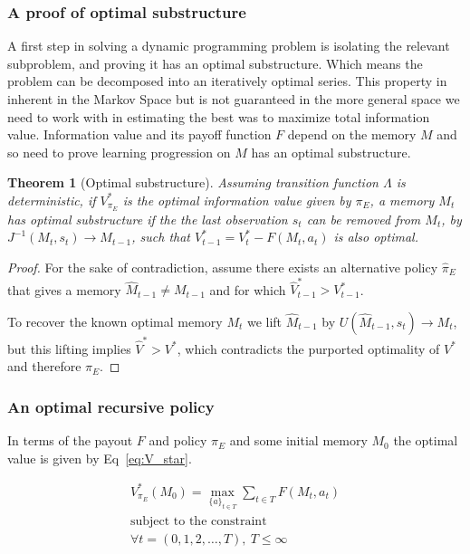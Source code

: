\documentclass[9pt,twocolumn,twoside]{pnas-new}
\newtheorem{theorem}{Theorem}
\begin{document}
\subsubsection*{A proof of optimal substructure}
A first step in solving a dynamic programming problem is isolating the relevant subproblem, and proving it has an optimal substructure. Which means the problem can be decomposed into an iteratively optimal series. This property in inherent in the Markov Space %
but is not guaranteed in the more general space we need to work with in estimating the best was to maximize total information value. Information value and its payoff function $F$ depend on the memory $M$ and so need to prove learning progression on $M$ has an optimal substructure.

\begin{theorem}[Optimal substructure] \label{theorem:opt_sub}
    Assuming transition function $\Lambda$ is deterministic, if $V^*_{\pi_E}$ is the optimal information value given by $\pi_E$, a memory $M_t$ has optimal substructure if the the last observation $s_t$ can be removed from $M_t$, by $J^{-1}(M_t, s_t) \rightarrow M_{t-1}$, such that $V^*_{t-1} = V^*_t - F(M_t, a_t)$ is also optimal. 
\end{theorem}
\begin{proof}
    For the sake of contradiction, assume there exists an alternative policy $\hat \pi_E$ that gives a memory $\hat M_{t-1} \neq M_{t-1}$ and for which $\hat V^*_{t-1} > V^*_{t-1}$. 

    To recover the known optimal memory $M_t$ we lift $\hat M_{t-1}$ by $U(\hat M_{t-1}, s_t) \rightarrow M_t$, but this lifting implies $\hat V^* > V^*$, which contradicts the purported optimality of $V^*$ and therefore $\pi_E$.
\end{proof}


\subsubsection*{An optimal recursive policy}
In terms of the payout $F$ and policy $\pi_E$ and some initial memory $M_0$ the optimal value is given by Eq~\ref{eq:V_star}.

\begin{equation} \label{eq:V_star}
    \begin{split}
        V^*_{\pi_E}(M_0) = \max_{\{a\}_{t \in T}} \sum_{t \in T} F(M_t, a_t)\\
        \text{subject to the constraint}\\
        \forall t = (0,1,2,\ldots, T),\ T \leq \infty
    \end{split}
\end{equation}
\end{document}

